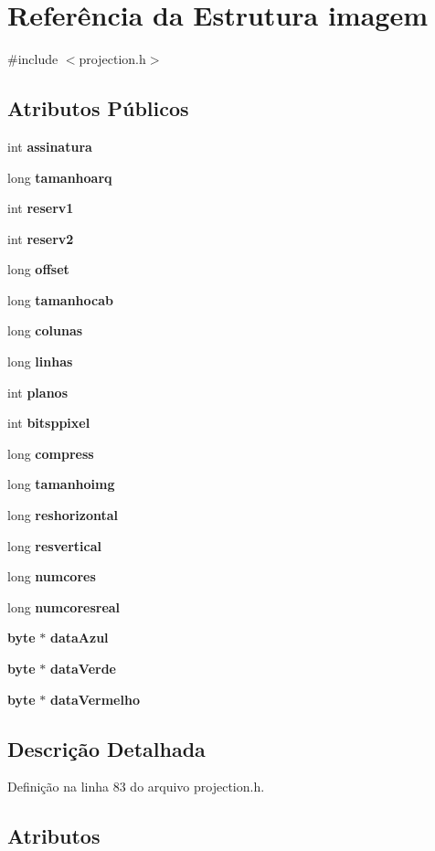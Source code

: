 \section{Referência da Estrutura imagem}
\label{structimagem}


{\ttfamily \#include $<$projection.\+h$>$}

\subsection*{Atributos Públicos}
\begin{DoxyCompactItemize}
\item 
int {\bf assinatura}
\item 
long {\bf tamanhoarq}
\item 
int {\bf reserv1}
\item 
int {\bf reserv2}
\item 
long {\bf offset}
\item 
long {\bf tamanhocab}
\item 
long {\bf colunas}
\item 
long {\bf linhas}
\item 
int {\bf planos}
\item 
int {\bf bitsppixel}
\item 
long {\bf compress}
\item 
long {\bf tamanhoimg}
\item 
long {\bf reshorizontal}
\item 
long {\bf resvertical}
\item 
long {\bf numcores}
\item 
long {\bf numcoresreal}
\item 
{\bf byte} $\ast$ {\bf data\+Azul}
\item 
{\bf byte} $\ast$ {\bf data\+Verde}
\item 
{\bf byte} $\ast$ {\bf data\+Vermelho}
\end{DoxyCompactItemize}


\subsection{Descrição Detalhada}


Definição na linha 83 do arquivo projection.\+h.



\subsection{Atributos}
